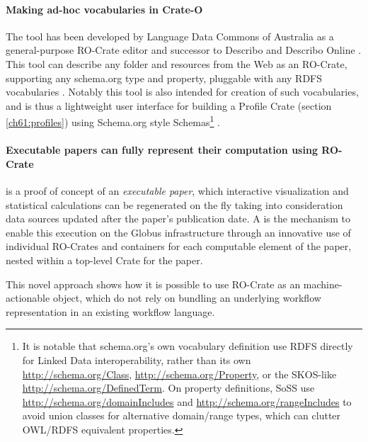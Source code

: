 \paragraph{Making ad-hoc vocabularies in Crate-O}\label{ch61:crate-o}
The  tool has been developed by Language Data Commons of Australia  as a general-purpose RO-Crate editor and successor to Describo \cite{La Rosa 2021d} and Describo Online \cite{La Rosa 2021c}. 
This tool can describe any folder and resources from the Web as an RO-Crate, supporting any schema.org type and property, pluggable with any \acrshort{RDFS} vocabularies \cite{Guha 2014}. 
Notably this tool is also intended for creation of such vocabularies, and is thus a lightweight user interface for building a Profile Crate (section \vref{ch61:profiles}) using Schema.org style Schemas\footnote{
  It is notable that schema.org's own vocabulary definition use \acrshort{RDFS} directly for Linked Data interoperability, 
  rather than its own \url{http://schema.org/Class}, \url{http://schema.org/Property}, or the \acrshort{SKOS}-like \url{http://schema.org/DefinedTerm}. 
  On property definitions, SoSS use \url{http://schema.org/domainIncludes} and \url{http://schema.org/rangeIncludes} to avoid union classes for alternative domain/range types, which can clutter \acrshort{OWL}/RDFS equivalent properties.} 
.

\paragraph{Executable papers can fully represent their computation using RO-Crate}
\label{ch61:livepublication}

 \cite{Ellerm 2023} is a proof of concept of an \emph{executable paper}, which interactive visualization and statistical calculations can be regenerated on the fly taking into consideration data sources updated after the paper's publication date. A  is the mechanism to enable this execution on the Globus infrastructure through an innovative use of individual RO-Crates and containers for each computable element of the paper, nested within a top-level Crate for the paper.

This novel approach shows how it is possible to use RO-Crate as an machine-actionable object, which do not rely on bundling an underlying workflow representation in an existing workflow language.  

